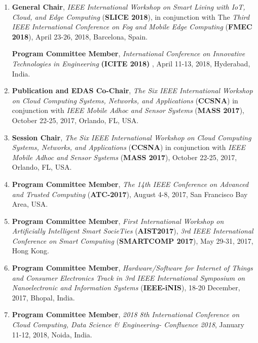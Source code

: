 \begin{enumerate}
\item
\textbf{General Chair}, \textit{IEEE International Workshop on Smart Living with IoT, Cloud, and Edge Computing }(\textbf{SLICE 2018}), in conjunction with The \textit{Third IEEE International Conference on Fog and Mobile Edge Computing} (\textbf{FMEC 2018}), April 23-26, 2018, Barcelona, Spain.

\textbf{Program Committee Member}, \textit{International Conference on Innovative Technologies in Engineering} \textbf{(ICITE 2018) }, April 11-13, 2018, Hyderabad, India.

\item
\textbf{Publication and EDAS Co-Chair}, \textit{The Six IEEE International Workshop on Cloud Computing Systems, Networks, and Applications }(\textbf{CCSNA}) in conjunction with \textit{IEEE Mobile Adhoc and Sensor Systems} (\textbf{MASS 2017}), October 22-25, 2017, Orlando, FL, USA. %

\item
\textbf{Session Chair}, \textit{The Six IEEE International Workshop on Cloud Computing Systems, Networks, and Applications }(\textbf{CCSNA}) in conjunction with \textit{IEEE Mobile Adhoc and Sensor Systems} (\textbf{MASS 2017}), October 22-25, 2017, Orlando, FL, USA.%

\item
\textbf{Program Committee Member}, \textit{The 14th IEEE Conference on Advanced and Trusted Computing} (\textbf{ATC-2017}), August 4-8, 2017, San Francisco Bay Area, USA. %

\item
\textbf{Program Committee Member}, \textit{First International Workshop on Artificially Intelligent Smart SocieTies} (\textbf{AIST2017}), \textit{3rd IEEE International Conference on Smart Computing} (\textbf{SMARTCOMP 2017}), May 29-31, 2017, Hong Kong.

\item
\textbf{Program Committee Member},\textit{ Hardware/Software for Internet of Things and Consumer Electronics Track in 3rd IEEE International Symposium on Nanoelectronic and Information Systems} (\textbf{IEEE-iNIS}), 18-20 December, 2017, Bhopal, India.

\item
\textbf{Program Committee Member}, \textit{2018 8th International Conference on Cloud Computing, Data Science \& Engineering- Confluence 2018}, January 11-12, 2018, Noida, India.


\end{enumerate}
